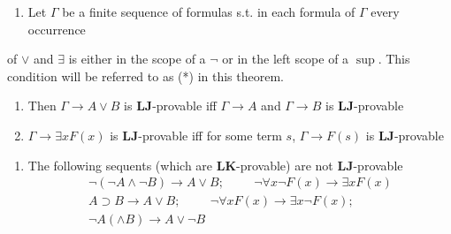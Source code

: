 \documentclass[11pt]{article}
\def \LJ {\textbf{LJ}}
\def \LK {\textbf{LK}}
\begin{document}
\begin{theorem}[Harrop]
\label{Problem2}
\begin{enumerate}
\item Let \(\Gamma\) be a finite sequence of formulas s.t. in each formula of \(\Gamma\) every occurrence
\end{enumerate}
of \(\vee\) and \(\exists\) is either in the scope of a \(\neg\) or in the left scope of
a \(\sup\). This condition will be referred to as (*) in this theorem.
\begin{enumerate}
\item Then \(\Gamma\to A\vee B\) is \(\LJ\)-provable iff  \(\Gamma\to A\) and \(\Gamma\to B\) is \(\LJ\)-provable
\item \(\Gamma\to\exists xF(x)\) is \(\LJ\)-provable iff for some term \(s\), \(\Gamma\to F(s)\) is \(\LJ\)-provable
\end{enumerate}
\begin{enumerate}
\item The following sequents (which are \(\LK\)-provable) are not \(\LJ\)-provable
\begin{gather*}
\neg(\neg A\wedge\neg B)\to A\vee B;\hspace{1cm}
\neg\forall x\neg F(x)\to\exists xF(x)\\
A\supset B\to A\vee B;\hspace{1cm}
\neg\forall xF(x)\to\exists x\neg F(x);\\
\neg A(\wedge B)\to A\vee \neg B
\end{gather*}
\end{enumerate}
\end{theorem}
\end{document}
